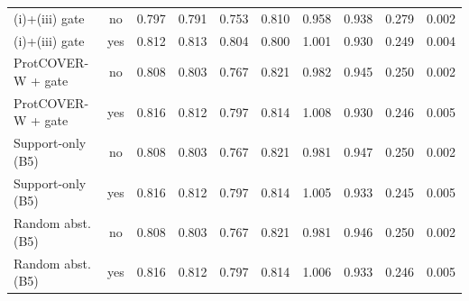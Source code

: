 \begin{longtable}{lccccccccc}
(i)+(iii) gate & no & 0.797 & 0.791 & 0.753 & 0.810 & 0.958 & 0.938 & 0.279 & 0.002 \\
(i)+(iii) gate & yes & 0.812 & 0.813 & 0.804 & 0.800 & 1.001 & 0.930 & 0.249 & 0.004 \\
ProtCOVER-W + gate & no & 0.808 & 0.803 & 0.767 & 0.821 & 0.982 & 0.945 & 0.250 & 0.002 \\
ProtCOVER-W + gate & yes & 0.816 & 0.812 & 0.797 & 0.814 & 1.008 & 0.930 & 0.246 & 0.005 \\
Support-only (B5) & no & 0.808 & 0.803 & 0.767 & 0.821 & 0.981 & 0.947 & 0.250 & 0.002 \\
Support-only (B5) & yes & 0.816 & 0.812 & 0.797 & 0.814 & 1.005 & 0.933 & 0.245 & 0.005 \\
Random abst. (B5) & no & 0.808 & 0.803 & 0.767 & 0.821 & 0.981 & 0.946 & 0.250 & 0.002 \\
Random abst. (B5) & yes & 0.816 & 0.812 & 0.797 & 0.814 & 1.006 & 0.933 & 0.246 & 0.005 \\
\bottomrule
\end{longtable}
